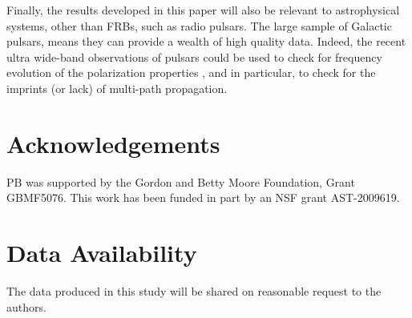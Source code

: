 \documentclass[fleqn,usenatbib]{mnras}
\begin{document}
	
	Finally, the results developed in this paper will also be relevant to astrophysical systems, other than FRBs, such as radio pulsars. The large sample of Galactic pulsars, means they can provide a wealth of high quality data. Indeed, the recent ultra wide-band observations of pulsars could be used to check for frequency evolution of the polarization properties \citep{Oswald2020}, and in particular, to check for the imprints (or lack) of multi-path propagation. 
	
	\section*{Acknowledgements}
	PB was supported by the Gordon and Betty Moore Foundation, Grant GBMF5076. This work has been funded in part by an NSF grant AST-2009619.
	
	\section*{Data Availability}
	The data produced in this study will be shared on reasonable request to the authors.
	
\end{document}
